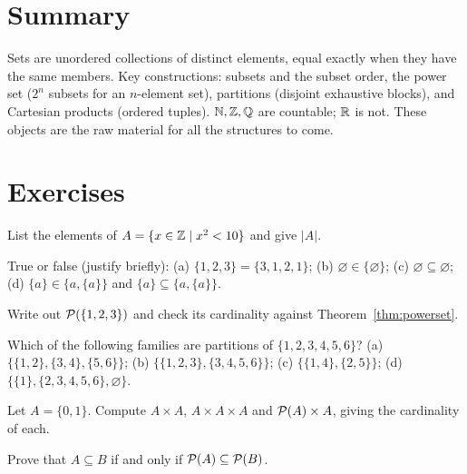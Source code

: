 \section{Summary}

Sets are unordered collections of distinct elements, equal exactly when they
have the same members. Key constructions: subsets and the subset order,
the power set ($2^n$ subsets for an $n$-element set), partitions
(disjoint exhaustive blocks), and Cartesian products (ordered tuples).
$\mathbb{N}, \mathbb{Z}, \mathbb{Q}$ are countable; $\mathbb{R}$ is not. These objects are the raw material
for all the structures to come.

\section*{Exercises}

\begin{exercise}{\easy}
List the elements of $A = \{x \in \mathbb{Z} \mid x^2 < 10\}$ and give $|A|$.
\end{exercise}

\begin{exercise}{\easy}
True or false (justify briefly):
(a) $\{1,2,3\} = \{3,1,2,1\}$;\quad
(b) $\varnothing \in \{\varnothing\}$;\quad
(c) $\varnothing \subseteq \varnothing$;\quad
(d) $\{a\} \in \{a, \{a\}\}$ and $\{a\} \subseteq \{a, \{a\}\}$.
\end{exercise}

\begin{exercise}{\easy}
Write out $\mathcal{P}(\{1, 2, 3\})$ and check its cardinality against
Theorem~\ref{thm:powerset}.
\end{exercise}

\begin{exercise}{\medium}
Which of the following families are partitions of $\{1,2,3,4,5,6\}$?
(a) $\{\{1,2\},\{3,4\},\{5,6\}\}$;\quad
(b) $\{\{1,2,3\},\{3,4,5,6\}\}$;\quad
(c) $\{\{1,4\},\{2,5\}\}$;\quad
(d) $\{\{1\},\{2,3,4,5,6\},\varnothing\}$.
\end{exercise}

\begin{exercise}{\medium}
Let $A = \{0,1\}$. Compute $A \times A$, $A \times A \times A$ and
$\mathcal{P}(A) \times A$, giving the cardinality of each.
\end{exercise}

\begin{exercise}{\medium}
Prove that $A \subseteq B$ if and only if $\mathcal{P}(A) \subseteq
\mathcal{P}(B)$.
\end{exercise}

